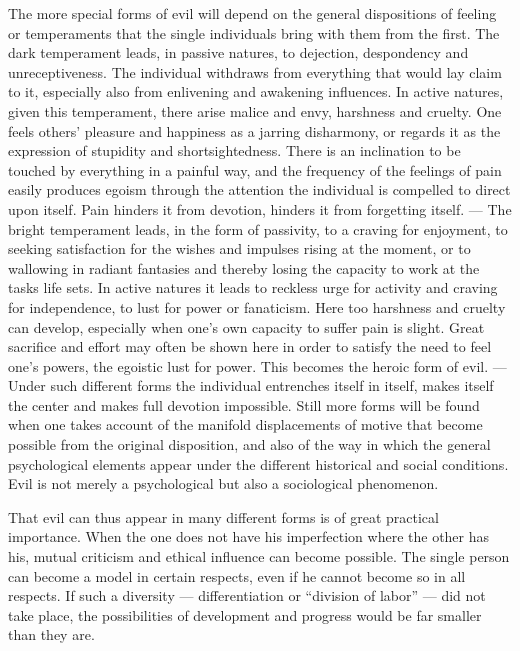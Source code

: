 \documentclass[12pt,a4paper,openany]{book}
\newcommand{\opage}[1]{\marginnote{\footnotesize\textit{[#1]}}}
\begin{document}
The more special forms of evil will depend on the general dispositions of feeling or temperaments that
the single individuals bring with them from the first. The dark temperament leads, in passive natures, to
dejection, despondency and unreceptiveness. The individual withdraws from everything that would lay claim
to it, especially also from enlivening and awakening influences. In active natures, given this
temperament, there arise malice and envy, harshness and cruelty. One feels others' pleasure and happiness
as a jarring disharmony, or regards it as the expression of stupidity and shortsightedness. There is an
inclination to be touched by everything in a painful way, and the frequency of the feelings of pain easily
produces
\opage{131}egoism through the attention the individual is compelled to direct upon itself. Pain hinders it from
devotion, hinders it from forgetting itself. --- The bright temperament leads, in the form of passivity, to
a craving for enjoyment, to seeking satisfaction for the wishes and impulses rising at the moment, or to
wallowing in radiant fantasies and thereby losing the capacity to work at the tasks life sets. In active
natures it leads to reckless urge for activity and craving for independence, to lust for power or
fanaticism. Here too harshness and cruelty can develop, especially when one's own capacity to suffer pain
is slight. Great sacrifice and effort may often be shown here in order to satisfy the need to feel one's
powers, the egoistic lust for power. This becomes the heroic form of evil. --- Under such different forms
the individual entrenches itself in itself, makes itself the center and makes full devotion impossible.
Still more forms will be found when one takes account of the manifold displacements of motive that become
possible from the original disposition, and also of the way in which the general psychological elements
appear under the different historical and social conditions. Evil is not merely a psychological but also
a sociological phenomenon.

That evil can thus appear in many different forms is of great practical importance. When the one does not
have his imperfection where the other has his, mutual criticism and ethical influence can become possible.
The single person can become a model in certain respects, even if he cannot become so in all respects. If
such a diversity --- differentiation or ``division of labor'' --- did not take place, the possibilities of
development and progress would be far smaller than they are.
\end{document}
